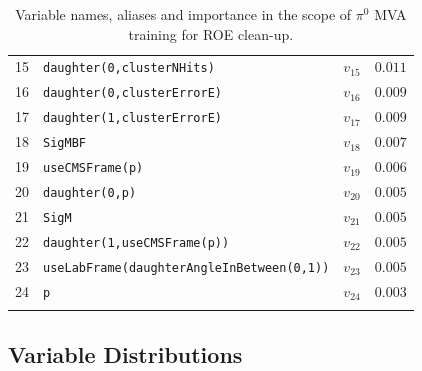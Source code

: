 \begin{longtable}{c|l|c|l}
15 &\texttt{\footnotesize daughter(0,clusterNHits)} & $v_{15}$ & $0.011$ \\ 
16 &\texttt{\footnotesize daughter(0,clusterErrorE)} & $v_{16}$ & $0.009$ \\ 
17 &\texttt{\footnotesize daughter(1,clusterErrorE)} & $v_{17}$ & $0.009$ \\ 
18 &\texttt{\footnotesize SigMBF} & $v_{18}$ & $0.007$ \\ 
19 &\texttt{\footnotesize useCMSFrame(p)} & $v_{19}$ & $0.006$ \\ 
20 &\texttt{\footnotesize daughter(0,p)} & $v_{20}$ & $0.005$ \\ 
21 &\texttt{\footnotesize SigM} & $v_{21}$ & $0.005$ \\ 
22 &\texttt{\footnotesize daughter(1,useCMSFrame(p))} & $v_{22}$ & $0.005$ \\ 
23 &\texttt{\footnotesize useLabFrame(daughterAngleInBetween(0,1))} & $v_{23}$ & $0.005$ \\ 
24 &\texttt{\footnotesize p} & $v_{24}$ & $0.003$ \\ 
\bottomrule
\captionsetup{width=0.8\linewidth}
\caption{Variable names, aliases and importance in the scope of $\pi^0$ MVA training for ROE clean-up.}
\end{longtable}

\subsection{Variable Distributions}

